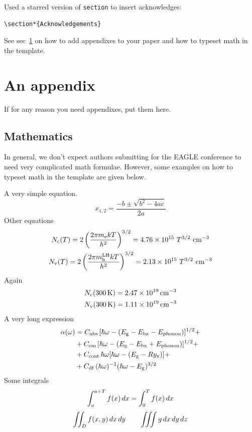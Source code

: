 \documentclass[amsthm,ebook]{saparticle}
\begin{document}
Used a starred version of \texttt{section} to insert acknowledges:

\begin{verbatim}
\section*{Acknowledgements}
\end{verbatim}

See sec~\ref{sec:app1} on how to add appendixes to your paper and how to typeset math in the template.

\appendix
\section{An appendix}\label{sec:app1}
If for any reason you need appendixes, put them here.
\subsection{Mathematics}

In general, we don't expect authors submitting for the EAGLE conference to need very complicated math formulae. However, some examples on how to typeset math in the template are given below.

A very simple equation.
\begin{equation}
x_{1,2}=\frac{-b\pm\sqrt{b^2-4ac}}{2a}
\end{equation}
Other equations
\begin{subequations}
\begin{gather}
N\rb{c}(T)=2\left( \frac{2\pi m\rb{e} kT}{h^2}\right)^{3/2}=\num{4.76e15}\,\,T^{3/2}\,\,\si{cm^{-3}}\\
N\rb{v}(T)=2\left( \frac{2\pi m\rb{h}\rp{LH} kT}{h^2}\right)^{3/2}=\num{2.13e15}\,\,T^{3/2}\,\,\si{cm^{-3}}
\end{gather}
\end{subequations}
%
Again
%
\begin{subequations}
\begin{gather}
N\rb{c}(300\un{K})=\SI{2.47e19}{cm^{-3}}\\
N\rb{v}(300\un{K})=\SI{1.11e19}{cm^{-3}}
\end{gather}
\end{subequations}
%
A very long expression
%
\begin{equation}
\begin{split}
\alpha(\omega)&= 
C\rb{abs}\,[\hbar\omega - (E\rb{g}-E\rb{bx}-E\rb{phonon})]^{1/2} + \\
&+ C\rb{em}\,[\hbar\omega - (E\rb{g}-E\rb{bx}+E\rb{phonon})]^{1/2} + \\
&+ C\rb{cont}\,\hbar\omega [\hbar\omega-(E\rb{g}-Ry\rb{x})] + \\
&+ C\rb{df}\,(\hbar \omega)^{-1}(\hbar \omega - E\rb{g})^{3/2}
\end{split}
\end{equation}
%
Some integrals
%
\begin{equation}
\int_a^{a+T} f(x) \di x = \int_0^T f(x) \di x
\end{equation}
\begin{equation}
\iint_D f(x,y) \di x \di y \qquad \iiint g \di x \di y \di z
\end{equation}
\end{document}
